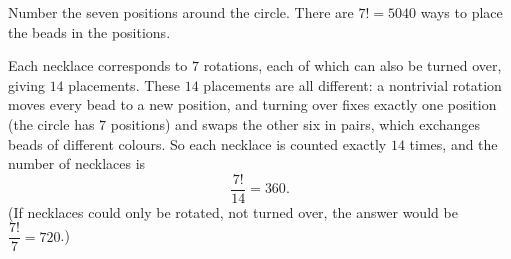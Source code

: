 Number the seven positions around the circle. There are $7!=5040$ ways to place the beads in the positions.

Each necklace corresponds to $7$ rotations, each of which can also be turned over, giving $14$ placements. These $14$ placements are all different: a nontrivial rotation moves every bead to a new position, and turning over fixes exactly one position (the circle has $7$ positions) and swaps the other six in pairs, which exchanges beads of different colours. So each necklace is counted exactly $14$ times, and the number of necklaces is
\[\dfrac{7!}{14}=\boxed{360}.\]
(If necklaces could only be rotated, not turned over, the answer would be $\dfrac{7!}{7}=720$.)
